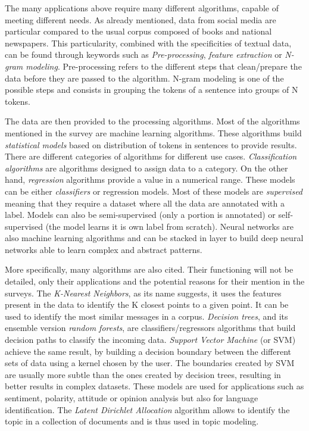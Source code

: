 The many applications above require many different algorithms, capable of meeting different needs.
As already mentioned, data from social media are particular compared to the usual corpus composed of books and national newspapers.
This particularity, combined with the specificities of textual data, can be found through keywords such as \emph{Pre-processing}, \emph{feature extraction} or \emph{N-gram modeling}.
Pre-processing refers to the different steps that clean/prepare the data before they are passed to the algorithm.
N-gram modeling is one of the possible steps and consists in grouping the tokens of a sentence into groups of N tokens.

The data are then provided to the processing algorithms.
Most of the algorithms mentioned in the survey are machine learning algorithms.
These algorithms build \emph{statistical models} based on distribution of tokens in sentences to provide results.
There are different categories of algorithms for different use cases.
\emph{Classification algorithms} are algorithms designed to assign data to a category.
On the other hand, \emph{regression} algorithms provide a value in a numerical range.
These models can be either \emph{classifiers} or regression models.
Most of these models are \emph{supervised} meaning that they require a dataset where all the data are annotated with a label.
Models can also be semi-supervised (only a portion is annotated) or self-supervised (the model learns it is own label from scratch).
Neural networks are also machine learning algorithms and can be stacked in layer to build deep neural networks able to learn complex and abstract patterns.

More specifically, many algorithms are also cited. Their functioning will not be detailed, only their applications and the potential reasons for their mention in the surveys.
The \emph{K-Nearest Neighbors}, as its name suggests, it uses the features present in the data to identify the K closest points to a given point.
It can be used to identify the most similar messages in a corpus.
\emph{Decision trees}, and its ensemble version \emph{random forests}, are classifiers/regressors algorithms that build decision paths to classify the incoming data.
\emph{Support Vector Machine} (or SVM) achieve the same result, by building a decision boundary between the different sets of data using a kernel chosen by the user.
The boundaries created by SVM are usually more subtle than the ones created by decision trees, resulting in better results in complex datasets.
These models are used for applications such as sentiment, polarity, attitude or opinion analysis but also for language identification.
The \emph{Latent Dirichlet Allocation} algorithm allows to identify the topic in a collection of documents and is thus used in topic modeling.

